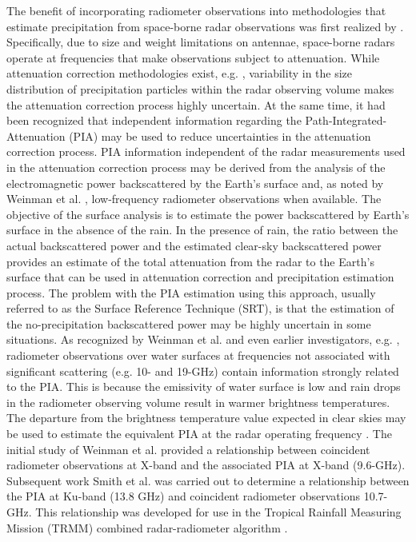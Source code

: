 \documentclass[10pt]{ietbook}
\begin{document}
The benefit of incorporating radiometer observations into methodologies that estimate precipitation from
space-borne radar observations was first realized by \cite{weinman90}. Specifically, due to size and weight limitations on antennae, space-borne radars 
operate at frequencies that make observations subject to attenuation. While
attenuation correction methodologies exist, e.g. \cite{hitschfeld1954}, variability in the size distribution of
precipitation particles within the radar observing volume makes the attenuation correction process highly uncertain.
At the same time, it had been recognized \cite{Meneghini1983} that independent information regarding the Path-Integrated-Attenuation (PIA) 
may be used to reduce uncertainties in the attenuation correction process. PIA information
independent of the radar measurements used in the attenuation correction process may be derived from the analysis
of the electromagnetic power backscattered by the Earth's surface \cite{Meneghini1983} and, as noted by Weinman et al. \cite{weinman90}, 
low-frequency radiometer observations when available.  The objective of the surface analysis is to estimate the power backscattered by Earth's surface in the 
absence of the rain.  In the presence of rain, the ratio between the actual backscattered power and the estimated clear-sky backscattered power provides an estimate
of the total attenuation from the radar to the Earth's surface \cite{Meneghini1983} that can be used in attenuation correction and precipitation estimation process. 
The problem with the PIA estimation using this approach, usually referred to as the Surface Reference Technique (SRT), is that the estimation of the no-precipitation 
backscattered power may be highly uncertain in some situations.  As recognized by Weinman et al. \cite{weinman90} and even earlier investigators, e.g. \cite{Fujita1985},
radiometer observations over water surfaces at frequencies not associated with significant scattering (e.g. 10- and 19-GHz) contain information strongly related to the PIA.  
This is because the emissivity of water surface is low and rain drops in the radiometer observing volume result in warmer brightness temperatures.  The departure from the
brightness temperature value expected in clear skies may be used to estimate the equivalent PIA at the radar operating frequency \cite{weinman90}.  The initial study of
Weinman et al. \cite{weinman90} provided a relationship between coincident radiometer observations at X-band and the associated PIA at X-band (9.6-GHz). Subsequent work 
Smith et al. \cite{smith1997} was carried out to determine a relationship between the PIA at Ku-band (13.8 GHz) and coincident radiometer observations 10.7-GHz. 
This relationship was developed for use in the Tropical Rainfall Measuring Mission (TRMM) \cite{kummerow1998} combined radar-radiometer algorithm \cite{haddad1997}.
\end{document}
